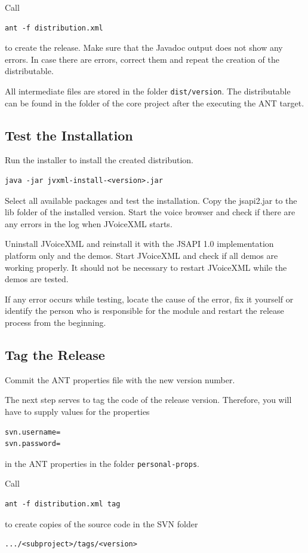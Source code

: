 \documentclass[11pt,a4paper]{article}
\begin{document}
Call
\begin{lstlisting}
ant -f distribution.xml
\end{lstlisting}
to create the release. Make sure that the Javadoc output does not show any
errors. In case there are errors, correct them and repeat the creation of the
distributable.

All intermediate files are stored in the folder \texttt{dist/version}. The
distributable can be found in the folder of the core project after the
executing the ANT target.

\subsection{Test the Installation}

Run the installer to install the created distribution.
\begin{lstlisting}
java -jar jvxml-install-<version>.jar
\end{lstlisting}
Select all available packages and test the installation. 
Copy the jsapi2.jar to the lib folder of the installed version.
Start the voice browser and check if there are any errors in the log when
JVoiceXML starts.

Uninstall JVoiceXML and reinstall it with the JSAPI 1.0 implementation platform
only and the demos. Start JVoiceXML and check if all demos are working properly.
It should not be necessary to restart JVoiceXML while the demos are tested.

If any error occurs while testing, locate the cause of the error, fix it
yourself or identify the person who is responsible for the module and restart
the release process from the beginning.

\subsection{Tag the Release}

Commit the ANT properties file with the new version number.

The next step serves to tag the code of the release version. Therefore, you
will have to supply values for the properties
\begin{lstlisting}
svn.username=
svn.password=
\end{lstlisting}
in the ANT properties in the folder \texttt{personal-props}.

Call
\begin{lstlisting}
ant -f distribution.xml tag
\end{lstlisting}
to create copies of the source code in the SVN folder
\begin{lstlisting}
.../<subproject>/tags/<version>
\end{lstlisting}
\end{document}
